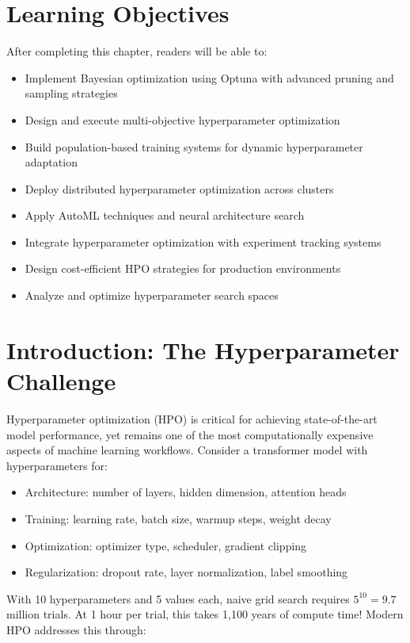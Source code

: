 \section{Learning Objectives}

After completing this chapter, readers will be able to:
\begin{itemize}
    \item Implement Bayesian optimization using Optuna with advanced pruning and sampling strategies
    \item Design and execute multi-objective hyperparameter optimization
    \item Build population-based training systems for dynamic hyperparameter adaptation
    \item Deploy distributed hyperparameter optimization across clusters
    \item Apply AutoML techniques and neural architecture search
    \item Integrate hyperparameter optimization with experiment tracking systems
    \item Design cost-efficient HPO strategies for production environments
    \item Analyze and optimize hyperparameter search spaces
\end{itemize}

\section{Introduction: The Hyperparameter Challenge}

Hyperparameter optimization (HPO) is critical for achieving state-of-the-art model performance, yet remains one of the most computationally expensive aspects of machine learning workflows. Consider a transformer model with hyperparameters for:

\begin{itemize}
    \item Architecture: number of layers, hidden dimension, attention heads
    \item Training: learning rate, batch size, warmup steps, weight decay
    \item Optimization: optimizer type, scheduler, gradient clipping
    \item Regularization: dropout rate, layer normalization, label smoothing
\end{itemize}

With 10 hyperparameters and 5 values each, naive grid search requires $5^{10} = 9.7$ million trials. At 1 hour per trial, this takes 1,100 years of compute time! Modern HPO addresses this through:

